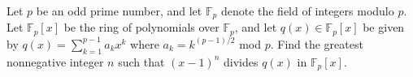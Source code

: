Let $p$ be an odd prime number, and let $\mathbb{F}_p$ denote the field of integers modulo $p$. Let $\mathbb{F}_p[x]$ be the ring of polynomials over $\mathbb{F}_p$, and let $q(x) \in \mathbb{F}_p[x]$ be given by $q(x) = \sum_{k=1}^{p-1} a_k x^k$ where $a_k = k^{(p-1)/2}$ mod $p$. Find the greatest nonnegative integer $n$ such that $(x-1)^n$ divides $q(x)$ in $\mathbb{F}_p[x]$.